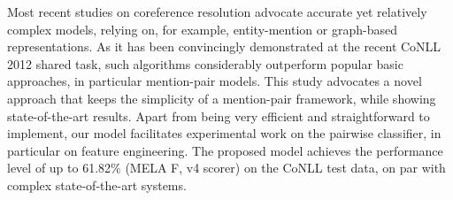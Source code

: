 Most recent studies on coreference resolution advocate accurate yet relatively complex models, relying on, for example, entity-mention or graph-based representations. As it has been convincingly demonstrated at the recent CoNLL 2012 shared task, such algorithms considerably outperform popular basic approaches, in particular mention-pair models. This study advocates a novel approach that keeps the simplicity of a mention-pair framework, while showing state-of-the-art results. Apart from being very efficient and straightforward to implement, our model facilitates experimental work on the pairwise classifier, in particular on feature engineering. The proposed model achieves the performance level of up to 61.82\% (MELA F, v4 scorer) on the CoNLL test data, on par with complex state-of-the-art systems.
